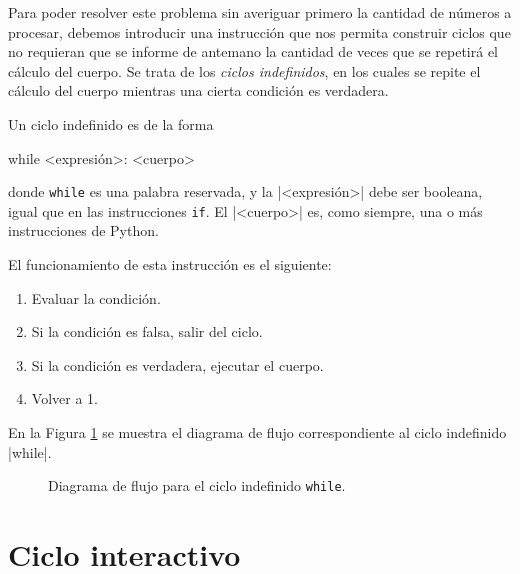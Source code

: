 Para poder resolver este problema sin averiguar primero la cantidad de números
a procesar, debemos introducir una instrucción que nos permita construir ciclos
que no requieran que se informe de antemano la cantidad de veces que se
repetirá el cálculo del cuerpo.  Se trata de los \emph{ciclos indefinidos},
en los cuales se repite el cálculo del cuerpo mientras una cierta condición es
verdadera.

Un ciclo indefinido es de la forma
\begin{codigo-python-sn}
while <expresión>:
    <cuerpo>
\end{codigo-python-sn}
donde \lstinline+while+ es una palabra reservada, y la |<expresión>| debe ser
booleana, igual que en las instrucciones \lstinline!if!. El |<cuerpo>| es, como
siempre, una o más instrucciones de Python.

El funcionamiento de esta instrucción es el siguiente:

\begin{enumerate}
\item Evaluar la condición.
\item Si la condición es falsa, salir del ciclo.
\item Si la condición es verdadera, ejecutar el cuerpo.
\item Volver a 1.
\end{enumerate}

En la Figura \ref{flujo-while} se muestra el diagrama de flujo correspondiente
al ciclo indefinido |while|.

\begin{figure}[hbt]
\caption{Diagrama de flujo para el ciclo indefinido \texttt{while}.}
\label{flujo-while}
\end{figure}

\section{Ciclo interactivo}

